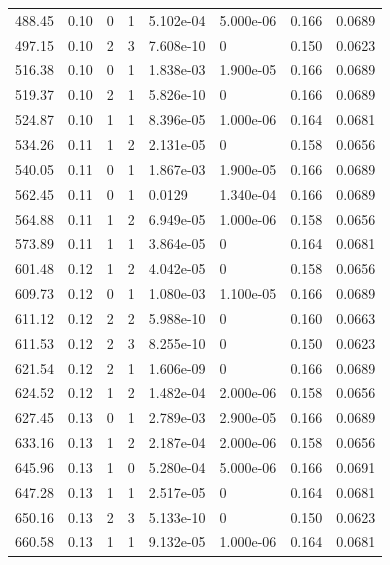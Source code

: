 \documentclass[preview]{standalone}
\begin{document}
{{{\begin{tabular}{L{1.2cm}C{1.2cm} C{0.3cm}C{0.5cm} C{1.4cm}C{1.4cm} C{1.4cm}C{1.4cm}}
  488.45  &  0.10  & 0     &  1 &  5.102e-04  & 5.000e-06  & 0.166 &  0.0689   \\ 
  497.15  &  0.10  & 2     &  3 &  7.608e-10  & 0  & 0.150 &  0.0623   \\ 
  516.38  &  0.10  & 0     &  1 &  1.838e-03  & 1.900e-05  & 0.166 &  0.0689   \\ 
  519.37  &  0.10  & 2     &  1 &  5.826e-10  & 0  & 0.166 &  0.0689   \\ 
  524.87  &  0.10  & 1     &  1 &  8.396e-05  & 1.000e-06  & 0.164 &  0.0681   \\ 
  534.26  &  0.11  & 1     &  2 &  2.131e-05  & 0  & 0.158 &  0.0656   \\ 
  540.05  &  0.11  & 0     &  1 &  1.867e-03  & 1.900e-05  & 0.166 &  0.0689   \\ 
  562.45  &  0.11  & 0     &  1 &  0.0129  & 1.340e-04  & 0.166 &  0.0689   \\ 
  564.88  &  0.11  & 1     &  2 &  6.949e-05  & 1.000e-06  & 0.158 &  0.0656   \\ 
  573.89  &  0.11  & 1     &  1 &  3.864e-05  & 0  & 0.164 &  0.0681   \\ 
  601.48  &  0.12  & 1     &  2 &  4.042e-05  & 0  & 0.158 &  0.0656   \\ 
  609.73  &  0.12  & 0     &  1 &  1.080e-03  & 1.100e-05  & 0.166 &  0.0689   \\ 
  611.12  &  0.12  & 2     &  2 &  5.988e-10  & 0  & 0.160 &  0.0663   \\ 
  611.53  &  0.12  & 2     &  3 &  8.255e-10  & 0  & 0.150 &  0.0623   \\ 
  621.54  &  0.12  & 2     &  1 &  1.606e-09  & 0  & 0.166 &  0.0689   \\ 
  624.52  &  0.12  & 1     &  2 &  1.482e-04  & 2.000e-06  & 0.158 &  0.0656   \\ 
  627.45  &  0.13  & 0     &  1 &  2.789e-03  & 2.900e-05  & 0.166 &  0.0689   \\ 
  633.16  &  0.13  & 1     &  2 &  2.187e-04  & 2.000e-06  & 0.158 &  0.0656   \\ 
  645.96  &  0.13  & 1     &  0 &  5.280e-04  & 5.000e-06  & 0.166 &  0.0691   \\ 
  647.28  &  0.13  & 1     &  1 &  2.517e-05  & 0  & 0.164 &  0.0681   \\ 
  650.16  &  0.13  & 2     &  3 &  5.133e-10  & 0  & 0.150 &  0.0623   \\ 
  660.58  &  0.13  & 1     &  1 &  9.132e-05  & 1.000e-06  & 0.164 &  0.0681   \\ 

\end{tabular}}}}
\end{document}
